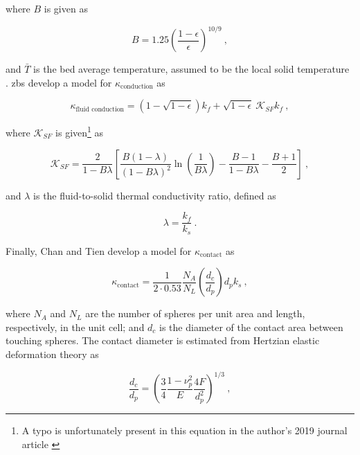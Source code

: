 \noindent where \(B\) is given as

\begin{equation}
\label{eq:KappaB}
B=1.25\left(\frac{1-\epsilon}{\epsilon}\right)^{10/9}\ ,
\end{equation}

\noindent and \(\bar{T}\) is the bed average temperature, assumed to be the local solid temperature \cite{auwerda_2011,breitbach}. \gls{zbs} develop a model for \(\kappa_\text{conduction}\) as \cite{tsotsas1987}

\begin{equation}
\label{eq:KappaFluidConductionZS}
\kappa_{\textrm{fluid conduction}}=\left(1-\sqrt{1-\epsilon}\right)k_f+\sqrt{1-\epsilon}\ \mathscr{K}_{SF}k_f\ ,
\end{equation}

\noindent where \(\mathscr{K}_{SF}\) is given\hspace{0.02cm}\footnote{A typo is unfortunately present in this equation in the author's 2019 journal article \cite{novak_sana}} as

\begin{equation}
\label{eq:ZBSKSF}
\mathscr{K}_{SF}=\frac{2}{1-B\lambda}\left\lbrack\frac{B(1-\lambda)}{(1-B\lambda)^2}\ln\left({\frac{1}{B\lambda}}\right)-\frac{B-1}{1-B\lambda}-\frac{B+1}{2}\right\rbrack\ ,
\end{equation}

\noindent and \(\lambda\) is the fluid-to-solid thermal conductivity ratio, defined as

\begin{equation}
\label{eq:lambdaDef}
\lambda=\frac{k_f}{k_s}\ .
\end{equation}

\noindent Finally, Chan and Tien develop a model for \(\kappa_\text{contact}\) as \cite{chan}

\begin{equation}
\label{eq:KappaSolidConductionCT}
\kappa_\text{contact}=\frac{1}{2\cdot0.53}\frac{N_A}{N_L}\left(\frac{d_c}{d_p}\right)d_pk_s\ ,
\end{equation}

\noindent where \(N_A\) and \(N_L\) are the number of spheres per unit area and length, respectively, in the unit cell; and \(d_c\) is the diameter of the contact area between touching spheres. The contact diameter is estimated from Hertzian elastic deformation theory as \cite{you}

\begin{equation}
\label{eq:ContactRadius}
\frac{d_c}{d_p}=\left(\frac{3}{4}\frac{1-\nu_p^2}{E}\frac{4F}{d_p^2}\right)^{1/3}\ ,
\end{equation}

